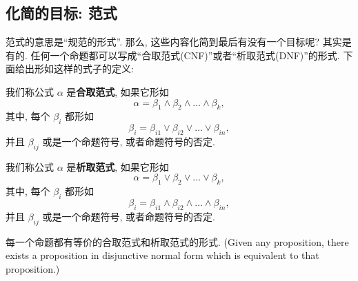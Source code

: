 \subsection{化简的目标: 范式}

范式的意思是``规范的形式''. 那么, 这些内容化简到最后有没有一个目标呢? 其实是有的. 任何一个命题都可以写成``合取范式(CNF)''或者``析取范式(DNF)''的形式. 下面给出形如这样的式子的定义:

 
\begin{definition}
            我们称公式 $\alpha$ 是{\bf 合取范式}, 如果它形如
            \[
              \alpha = \beta_{1} \land \beta_{2} \land \dots \land \beta_{k},
            \]
            其中, 每个 $\beta_{i}$ 都形如
            \[
              \beta_{i} = \beta_{i1} \lor \beta_{i2} \lor \dots \lor \beta_{in},
            \]
            并且 $\beta_{ij}$ 或是一个命题符号, 或者命题符号的否定. 
    \end{definition}


   \begin{definition}
            我们称公式 $\alpha$ 是{\bf 析取范式}, 如果它形如
            \[
              \alpha = \beta_{1} \lor \beta_{2} \lor \dots \lor \beta_{k},
            \]
            其中, 每个 $\beta_{i}$ 都形如
            \[
              \beta_{i} = \beta_{i1} \land \beta_{i2} \land \dots \land \beta_{in},
            \]
            并且 $\beta_{ij}$ 或是一个命题符号, 或者命题符号的否定. 
    \end{definition}

\begin{theorem}
	每一个命题都有等价的合取范式和析取范式的形式. (Given any proposition, there exists a proposition in disjunctive normal form which is equivalent to that proposition.)
\end{theorem}

